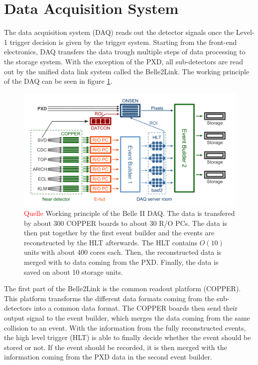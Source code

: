 \documentclass[a4paper,11pt,twosided,final,german,openbib,pdftex,listof=totoc,bibliography=totoc]{scrbook}
\begin{document}
\section{Data Acquisition System}
\label{sec:DAQ}

The data acquisition system (DAQ) reads out the detector signals once the Level-1 trigger decision is given by the trigger system. Starting from the front-end electronics, DAQ transfers the data trough multiple steps of data processing to the storage system. With the exception of the PXD, all sub-detectors are read out by the unified data link system called the Belle2Link. The working principle of the DAQ can be seen in figure \ref{fig:DAQ}.

\begin{figure}[h!]
	\centering
	\includegraphics[width=\textwidth]{Bilder/DAQ}
	\caption[Working Principle of the DAQ]{\textcolor{red}{Quelle} Working principle of the Belle II DAQ. The data is transfered by about 300 COPPER boards to about 30 R/O PCs. The data is then put together by the first event builder and the events are reconstructed by the HLT afterwards. The HLT contains $O(10)$ units with about 400 cores each. Then, the reconstructed data is merged with to data coming from the PXD. Finally, the data is saved on about 10 storage units. \cite{Filippo:1097}}
	\label{fig:DAQ}
\end{figure}

The first part of the Belle2Link is the common readout platform (COPPER). This platform transforms the different data formats coming from the sub-detectors into a common data format. The COPPER boards then send their output signal to the event builder, which merges the data coming from the same collision to an event. With the information from the fully reconstructed events, the high level trigger (HLT) is able to finally decide whether the event should be stored or not. If the event should be recorded, it is then merged with the information coming from the PXD data in the second event builder.
\end{document}
